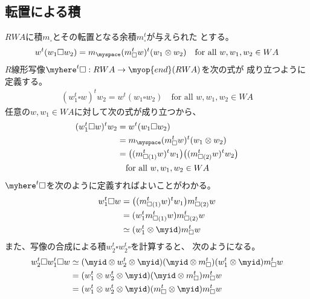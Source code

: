 	\subsection{転置による積}\label{s2:転置による積} %
		$RWA$に積$m_\square$とその転置となる余積$m_\square^t$が与えられた
		とする。
		\begin{equation*}\begin{split} %
			w^t(w_1\square w_2) = m_\myspace(m_\square^tw)^t(w_1\otimes w_2)
			\quad\text{for all }w,w_1,w_2\in WA
		\end{split}\end{equation*} %
		$R$線形写像$\myhere^t\square:RWA\to \myop{end}(RWA)$を次の式が
		成り立つように定義する。
		\begin{equation*}\begin{split} %
			(w_1^t\square w)^tw_2 = w^t(w_1\square w_2)
			\quad\text{for all }w,w_1,w_2\in WA
		\end{split}\end{equation*} %
		任意の$w,w_1\in WA$に対して次の式が成り立つから、
		\begin{equation*}\begin{split} %
			(w_1^t\square w)^tw_2 &= w^t(w_1\square w_2) \\
			&= m_\myspace(m_\square^t w)^t(w_1\otimes w_2) \\
			&= \bigl((m_{\square(1)}^tw)^tw_1\bigr)
				\bigl((m_{\square(2)}^tw)^tw_2\bigr) \\
			&\quad\text{for all }w,w_1,w_2\in WA
		\end{split}\end{equation*} %
		$\myhere^t\square$を次のように定義すればよいことがわかる。
		\begin{equation*}\begin{split} %
			w_1^t\square w 
			&= \bigl((m_{\square(1)}^tw)^tw_1\bigr)m_{\square(2)}^tw \\
			&= (w_1^tm_{\square(1)}^tw)m_{\square(2)}^tw \\
			&\simeq (w_1^t\otimes\myid)m_{\square}^tw \\
		\end{split}\end{equation*} %
		また、写像の合成による積$w_2^t\square w_2^t\square$を計算すると、
		次のようになる。
		\begin{equation}\label{eq:転置による積の結合性の計算}\begin{split} %
			w_2^t\square w_1^t\square w
			&\simeq (\myid\otimes w_2^t\otimes\myid)(\myid\otimes m_{\square}^t)
				(w_1^t\otimes\myid)m_{\square}^tw \\
			&= (w_1^t\otimes w_2^t\otimes\myid)(\myid\otimes m_{\square}^t)
				m_{\square}^tw \\
			&= (w_1^t\otimes w_2^t\otimes\myid)(m_{\square}^t\otimes \myid)
				m_{\square}^tw \\
		\end{split}\end{equation} %
